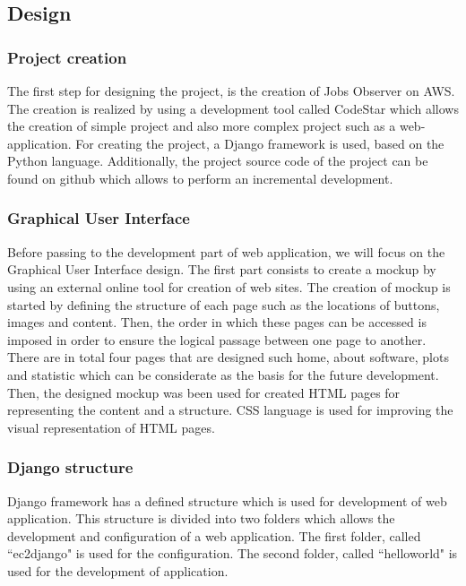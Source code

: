 \documentclass[conference,compsoc]{IEEEtran}
\begin{document}
\subsection{Design}
\subsubsection{Project creation}
The first step for designing the project, is the creation of Jobs Observer on AWS. The creation is realized by using a development tool called CodeStar which allows the creation of simple project and also more complex project such as a web-application.
\newline
For creating the project, a Django framework is used, based on the Python language. Additionally, the project source code of the project can be found on github which allows to perform an incremental development. 
 
\subsubsection{Graphical User Interface}
Before passing to the development part of web application, we will focus on the Graphical User Interface design. 
\newline
The first part consists to create a mockup by using an external online tool for creation of web sites. The creation of mockup is started by defining the structure of each page such as the locations of buttons, images and content. Then, the order in which these pages can be accessed is imposed in order to ensure the logical passage between one page to another. 
\newline
There are in total four pages that are designed such home, about software, plots and statistic which can be considerate as the basis for the future development. 
\newline
Then, the designed mockup was been used for created HTML pages for representing the content and a structure. CSS language is used for improving the visual representation of HTML pages. 

\subsubsection{Django structure}
Django framework has a defined structure which is used for development of web application. This structure is divided into two folders which allows the development and configuration of a web application. The first folder, called ``ec2django" is used for the configuration. The second folder, called ``helloworld" is used for the development of application.
\end{document}
